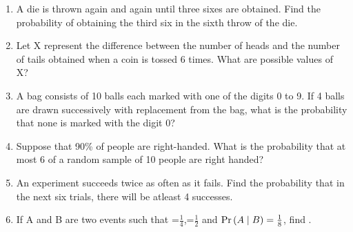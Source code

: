\begin{enumerate}[label=\thechapter.\arabic*,ref=\thechapter.\theenumi]
\item A die is thrown again and again until three sixes are obtained. Find the probability of obtaining the third six in the sixth throw of the die.
\item Let X represent the difference between the number of heads and the number of
tails obtained when a coin is tossed 6 times. What are possible values of X?
\item A bag consists of 10 balls each marked with one of the digits 0 to 9. If 4 balls are drawn successively with replacement from the bag, what is the probability that none is marked with the digit 0?
\item Suppose that 90\% of people are right-handed. What is the probability that at most 6 of a random sample of 10 people are right handed?
\item An experiment succeeds twice as often as it fails. Find the probability that in the next six trials, there will be atleast 4 successes.
\item If A and B are two events such that =$\frac{1}{4}$,=$\frac{1}{2}$ and $\Pr\left( A\mid B\right)=\frac{1}{8}$,
find .
\end{enumerate}
